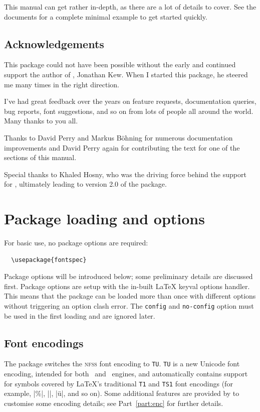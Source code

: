 \documentclass[a4paper]{l3doc}
\begin{document}
This manual can get rather in-depth, as there are a lot of details
to cover. See the documents  for a complete minimal example
to get started quickly.


\subsection{Acknowledgements}

This package could not have been possible without the early and continued support
the author of \XeTeX, Jonathan Kew. When I started this package, he steered
me many times in the right direction.

I've had great
feedback over the years on feature requests, documentation queries, bug reports, font suggestions, and so on from lots of people all around the world.
Many thanks to you all.

Thanks to David Perry and Markus B\"ohning for numerous documentation
improvements and David Perry again for contributing the text for one of the
sections of this manual.

Special thanks to Khaled Hosny, who was the driving force behind the support for \LuaLaTeX, ultimately leading to version 2.0 of the package.



\section{Package loading and options}

For basic use, no package options are required:
\begin{Verbatim}
  \usepackage{fontspec}
\end{Verbatim}
Package options will be introduced below; some preliminary details are discussed first.
Package options are setup with the in-built \LaTeX{} keyval options handler. This means
that the package can be loaded more than once with different options without triggering
an option clash error.
The \texttt{config} and \texttt{no-config} option must be used in
the first loading and are ignored later.

\subsection{Font encodings}

The package switches the \textsc{nfss} font encoding to \texttt{TU}.
\texttt{TU} is a new Unicode font encoding, intended for both \XeTeX\ and \LuaTeX\ engines, and automatically contains support for symbols covered by \LaTeX's traditional \texttt{T1} and \texttt{TS1} font encodings (for example, |\%|, |\textbullet|, |\"u|, and so on).
Some additional features are provided by  to customise some encoding details; see Part~\vref{part:enc} for further details.
\end{document}
